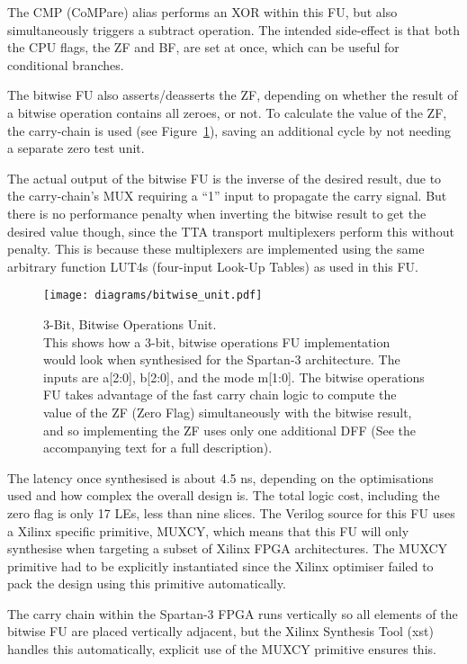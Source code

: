 The CMP (CoMPare) alias performs an XOR within this FU, but also simultaneously
triggers a subtract operation. The intended side-effect is that both the CPU
flags, the ZF and BF, are set at once, which can be useful for conditional
branches.

The bitwise FU also asserts/deasserts the ZF, depending on whether the result
of a bitwise operation contains all zeroes, or not. To calculate the value of
the ZF, the carry-chain is used (see Figure~\ref{CPU_Bitwise_Unit}), saving an
additional cycle by not needing a separate zero test unit.

The actual output of the bitwise FU is the inverse of the desired result, due to
the carry-chain's MUX requiring a ``1'' input to propagate the carry signal. But
there is no performance penalty when inverting the bitwise result to get the
desired value though, since the TTA transport multiplexers perform this without
penalty. This is because these multiplexers are implemented using the same
arbitrary function LUT4s (four-input Look-Up Tables) as used in this FU.

\begin{figure}[h!]
\begin{center}
\texttt{[image: diagrams/bitwise\_unit.pdf]}
\caption[3-Bit, Bitwise Operations Unit]{3-Bit, Bitwise Operations Unit. \\
This shows how a 3-bit, bitwise operations FU implementation would look when
synthesised for the Spartan-3 architecture. The inputs are a[2:0], b[2:0],
and the mode m[1:0]. The bitwise operations FU takes advantage of the fast
carry chain logic to compute the value of the ZF (Zero Flag) simultaneously
with the bitwise result, and so implementing the ZF uses only one additional
DFF (See the accompanying text for a full description).}
\label{CPU_Bitwise_Unit}
\end{center}
\end{figure}

The latency once synthesised is about 4.5 ns, depending on the optimisations used
and how complex the overall design is. The total logic cost, including the zero
flag is only 17 LEs, less than nine slices. The Verilog source for this FU uses a
Xilinx specific primitive, MUXCY, which means that this FU will only synthesise
when targeting a subset of Xilinx FPGA architectures. The MUXCY primitive had to
be explicitly instantiated since the Xilinx optimiser failed to pack the design
using this primitive automatically.

The carry chain within the Spartan-3 FPGA runs vertically so all elements of the
bitwise FU are placed vertically adjacent, but the Xilinx Synthesis
Tool (\gls{xst}) handles this
automatically, explicit use of the MUXCY primitive ensures this.

